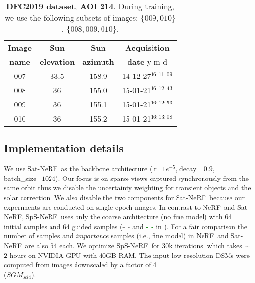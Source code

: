\documentclass{isprs} %
\newcommand{\Nerf}{{NeRF}}
\newcommand{\OurNeRFShort}{{SpS-NeRF}}
\begin{document}
\begin{table}[t!]
\centering
\begin{tabular}{|c|c|c|c|}
\hline
\textbf{Image} & \textbf{Sun} & \textbf{Sun} & \textbf{Acquisition} \\ 
\textbf{name}   & \textbf{elevation} & \textbf{azimuth} & \textbf{date}  y-m-d\\\hline\hline
007 & 33.5 & 158.9 & 14-12-27$^{16:11:09}$ \\ \hline 
008 & 36 & 155.0 & 15-01-21$^{16:12:43}$ \\ \hline
009 & 36 & 155.1 & 15-01-21$^{16:12:53}$ \\ \hline
010 & 36 & 155.2 & 15-01-21$^{16:13:08}$ \\ \hline
\end{tabular}
\caption{\textbf{DFC2019 dataset, AOI 214}. During training, we use the following subsets of images: $\{ 009, 010 \}$, $\{ 008, 009, 010 \}$.}
\label{DFC2019}%
\end{table}

\subsection{Implementation details}
%
We use Sat-\Nerf~as the backbone architecture (lr=$1e^{-5}$, decay= $0.9$, batch\_size=$1024$). Our focus is on sparse views captured synchronously from the same orbit thus we disable the uncertainty weighting for transient objects and the solar correction. %
We also disable the two components for Sat-\Nerf~because our experiments are conducted on single-epoch images. In contrast to \Nerf~and Sat-\Nerf, \OurNeRFShort~uses only the coarse architecture (no fine model) with 64 initial samples and 64 guided samples (\textcolor{Gray}{\textbf{- -}} and \textcolor{ForestGreen}{\textbf{- -}} in ). For a fair comparison the number of samples and \textit{importance} samples (i.e., fine model) in \Nerf~and Sat-\Nerf~are also 64 each. We optimize \OurNeRFShort~for 30k iterations, which takes $\sim$2 hours on NVIDIA GPU with 40GB RAM. The input low resolution DSMs were computed from images downscaled by a factor of 4 \\
({$SGM_{scl4}$}).
\end{document}
